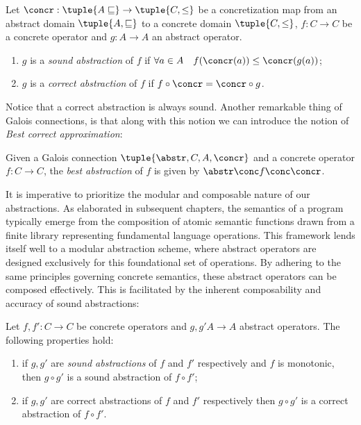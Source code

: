 \begin{definition}
  Let \(\concr : \tuple{A \sqsubseteq} \to \tuple{C, \leq}\) be a
  concretization map from an abstract domain
  \(\tuple{A, \sqsubseteq}\) to a concrete domain \(\tuple{C, \leq}\),
  \(f : C \to C\) be a concrete operator and \(g : A \to A\) an
  abstract operator.
  \begin{enumerate}
  \item \(g\) is a \emph{sound abstraction} of \(f\) if
    \(\forall a \in A \quad f(\concr(a)) \leq \concr(g(a))\);
  \item \(g\) is a \emph{correct abstraction} of \(f\) if
    \(f \circ \concr = \concr \circ g\).
  \end{enumerate}
\end{definition}

Notice that a correct abstraction is always sound.  Another remarkable
thing of Galois connections, is that along with this notion we can
introduce the notion of \emph{Best correct approximation}:

\begin{definition}
  Given a Galois connection \(\tuple{\abstr, C, A, \concr}\) and a
  concrete operator \(f : C \to C\), the \emph{best abstraction} of
  \(f\) is given by \(\abstr \conc f \conc \concr\).
\end{definition}

It is imperative to prioritize the modular and composable nature of
our abstractions. As elaborated in subsequent chapters, the semantics
of a program typically emerge from the composition of atomic semantic
functions drawn from a finite library representing fundamental
language operations. This framework lends itself well to a modular
abstraction scheme, where abstract operators are designed exclusively
for this foundational set of operations. By adhering to the same
principles governing concrete semantics, these abstract operators can
be composed effectively. This is facilitated by the inherent
composability and accuracy of sound abstractions:

\begin{theorem}\label{th:opcomp}
  Let \(f, f' : C \to C\) be concrete operators and \(g, g' A \to A\)
  abstract operators. The following properties hold:
  \begin{enumerate}[label=(\arabic*)]
  \item if \(g, g'\) are \emph{sound abstractions} of \(f\) and \(f'\)
    respectively and \(f\) is monotonic, then \(g \circ g'\) is a
    sound abstraction of \(f \circ f'\);
  \item if \(g, g'\) are correct abstractions of \(f\) and \(f'\)
    respectively then \(g \circ g'\) is a correct abstraction of
    \(f \circ f'\).
  \end{enumerate}
\end{theorem}

